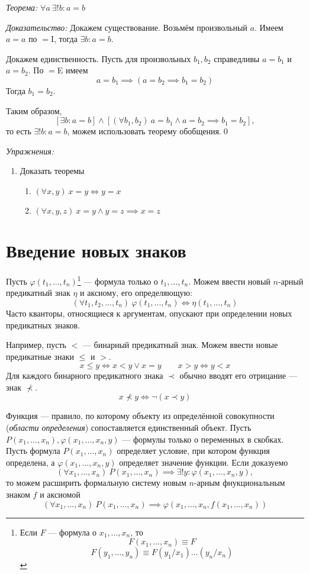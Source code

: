 {\it Теорема:} $\forall a~\exists !b:a=b$

{\it Доказательство:}
Докажем существование.
Возьмём произвольный $a$. Имеем $a=a$ по $=$I,
тогда $\exists b:a=b$.

Докажем единственность. Пусть для произвольных $b_1,b_2$
справедливы $a=b_1$ и $a=b_2$. По $=$E имеем
\[
  a=b_1\implies (a=b_2\implies b_1=b_2)
\]
Тогда $b_1=b_2$.

Таким образом,
\[
  [\exists b:a=b]\land[(\forall b_1,b_2)~a=b_1\land a=b_2\implies b_1=b_2],
\]
то есть $\exists !b:a=b$, можем использовать теорему обобщения.\qed

\vspace{1em}
{\it Упражнения:}
\begin{enumerate}
  \item{}Доказать теоремы
  \begin{enumerate}
    \item{}$(\forall x,y)~x=y\iff y=x$
    \item{}$(\forall x,y,z)~x=y\land y=z\implies x=z$
  \end{enumerate}
\end{enumerate}

\section{Введение новых знаков}

Пусть $\varphi(t_1,...,t_{n})$\footnote{
Если $F$ --- формула о $x_1,...,x_{n}$, то
\[
  F(x_1,...,x_{n})\equiv F
\]
\[F(y_1,...,y_{n})\equiv F(y_1/x_1)...(y_{n}/x_{n})\]} --- формула
только о $t_1,...,t_{n}$. Можем ввести новый $n$-арный предикатный знак $\eta$
и аксиому, его определяющую:
\[
  (\forall t_1,t_2,...,t_{n})~\varphi(t_1,...,t_{n})\iff\eta(t_1,...,t_{n})
\]
Часто  кванторы, относящиеся к аргументам, опускают
при определении новых предикатных знаков.

Например, пусть $<$ --- бинарный предикатный знак.
Можем ввести новые предикатные знаки $\leq$ и $>$.
\[
  x\leq y\iff x<y\lor x=y\qquad x>y\iff y< x
\]
Для каждого бинарного предикатного знака $\prec$ обычно
вводят его отрицание --- знак $\nprec$.
\[
  x\nprec y\iff \lnot(x\prec y)
\]

Функция --- правило, по которому объекту
из определённой совокупности ({\it области определения})
сопоставляется единственный объект.
Пусть $P(x_1,...,x_{n}),\varphi(x_1,...,x_{n},y)$ --- формулы только
о переменных в скобках.
Пусть формула $P(x_1,...,x_{n})$ определяет условие, при котором функция определена,
а $\varphi(x_1,...,x_{n},y)$ определяет значение функции.
Если доказуемо
\[
  (\forall x_1,...,x_{n})~P(x_1,...,x_{n})
  \implies \exists! y:\varphi(x_1,...,x_{n},y),
\]
то можем расширить формальную систему новым $n$-арным фнукциональным знаком $f$
и аксиомой
\[
  (\forall x_1,...,x_{n})~P(x_1,...,x_{n})
  \implies \varphi(x_1,...,x_{n},f(x_1,...,x_{n}))
\]

